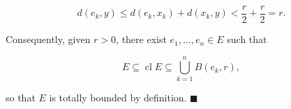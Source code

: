 \documentclass{article}
\DeclareMathOperator{\cl}{cl}
\begin{document}
\begin{equation*}
    d(e_k,y)\leq d(e_k,x_k)+d(x_k,y)<\frac{r}{2}+\frac{r}{2}=r.
\end{equation*}

Consequently, given $r>0$, there exist $e_1,\dots ,e_n\in E$ such that

\begin{equation*}
    E\subseteq \cl E\subseteq \bigcup_{k=1}^{n}B\left(e_k,r\right),
\end{equation*}

so that $E$ is totally bounded by definition. $\blacksquare$

\printbibliography[
heading=bibintoc,
title={References}
]
\end{document}
